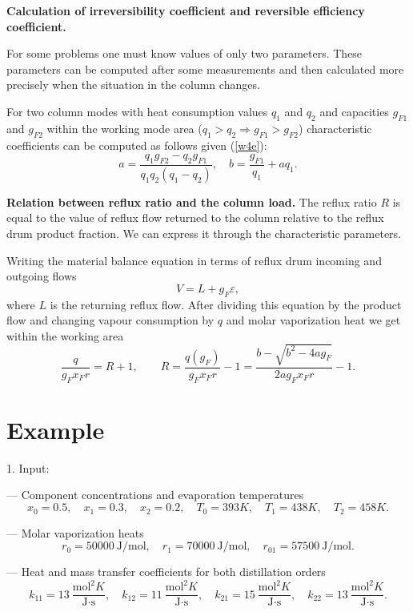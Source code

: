 \documentclass[12pt]{article}
\begin{document}
\textbf{Calculation of irreversibility coefficient and reversible efficiency coefficient.}

For some problems one must know values of only two parameters. These parameters can be computed after some measurements and then calculated more precisely when the situation in the column changes.

For two column modes with heat consumption values $q_1$ and $q_2$ and capacities $g_{F1}$ and $g_{F2}$ within the working mode area ($q_1 >q_2\Rightarrow g_{F1}>g_{F2}$) characteristic coefficients can be computed as follows given (\ref{w4e}):
\begin{equation}
a=\frac{q_1 g_{F2}-q_2g_{F1}}{q_1q_2(q_1-q_2)}, \quad b=\frac{g_{F1}}{q_1}+aq_1.
\label{g11}
\end{equation}

\textbf{Relation between reflux ratio and the column load.}
The reflux ratio $R$ is equal to the value of reflux flow returned to the column relative to the reflux drum product fraction. We can express it through the characteristic parameters.

Writing the material balance equation in terms of reflux drum incoming and outgoing flows
$$
 V=L+g_F\varepsilon,
$$
where $L$ is the returning reflux flow. After dividing this equation by the product flow and changing vapour consumption by $q$ and molar vaporization heat we get within the working area
\begin{equation}
\frac{q}{g_Fx_Fr}=R+1,\qquad R=\frac{q(g_F)}{g_Fx_Fr}-1=\frac {b - \sqrt{b^2 - 4ag_F}}{2ag_Fx_Fr}-1.
\label{f4e}
\end{equation}   

\section{Example}

1. Input:

--- Component concentrations and evaporation temperatures
$$
x_0 = 0.5,\quad
x_1 = 0.3,\quad
x_2 = 0.2,\quad
T_0 = 393K,\quad
T_1 = 438K,\quad
T_2 = 458K.
$$

--- Molar vaporization heats
$$
r_0 = 50000\:\mbox{J/mol},\quad
r_1 = 70000\:\mbox{J/mol},\quad
r_{01} = 57500\:\mbox{J/mol}.
$$

--- Heat and mass transfer coefficients for both distillation orders
$$
k_{11}=13\: \frac{\mbox{mol}^2K}{\mbox{J}\cdot\mbox{s}},\quad
k_{12} = 11\: \frac{\mbox{mol}^2K}{\mbox{J}\cdot\mbox{s}},\quad
k_{21} = 15\: \frac{\mbox{mol}^2K}{\mbox{J}\cdot\mbox{s}},\quad
k_{22} = 13\: \frac{\mbox{mol}^2K}{\mbox{J}\cdot\mbox{s}}.
$$
\end{document}
